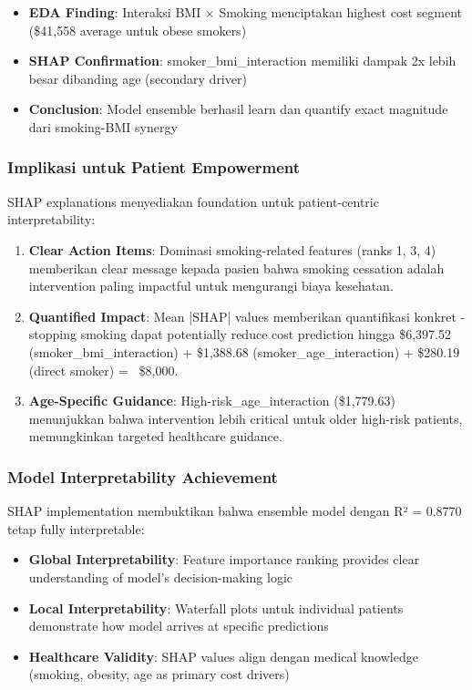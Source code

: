 \begin{itemize}
    \item \textbf{EDA Finding}: Interaksi BMI × Smoking menciptakan highest cost segment (\$41,558 average untuk obese smokers)
    \item \textbf{SHAP Confirmation}: smoker\_bmi\_interaction memiliki dampak 2x lebih besar dibanding age (secondary driver)
    \item \textbf{Conclusion}: Model ensemble berhasil learn dan quantify exact magnitude dari smoking-BMI synergy
\end{itemize}

\subsubsection{Implikasi untuk Patient Empowerment}

SHAP explanations menyediakan foundation untuk patient-centric interpretability:

\begin{enumerate}
    \item \textbf{Clear Action Items}: Dominasi smoking-related features (ranks 1, 3, 4) memberikan clear message kepada pasien bahwa smoking cessation adalah intervention paling impactful untuk mengurangi biaya kesehatan.

    \item \textbf{Quantified Impact}: Mean |SHAP| values memberikan quantifikasi konkret - stopping smoking dapat potentially reduce cost prediction hingga \$6,397.52 (smoker\_bmi\_interaction) + \$1,388.68 (smoker\_age\_interaction) + \$280.19 (direct smoker) = ~\$8,000.

    \item \textbf{Age-Specific Guidance}: High-risk\_age\_interaction (\$1,779.63) menunjukkan bahwa intervention lebih critical untuk older high-risk patients, memungkinkan targeted healthcare guidance.
\end{enumerate}

\subsubsection{Model Interpretability Achievement}

SHAP implementation membuktikan bahwa ensemble model dengan R² = 0.8770 tetap fully interpretable:

\begin{itemize}
    \item \textbf{Global Interpretability}: Feature importance ranking provides clear understanding of model's decision-making logic
    \item \textbf{Local Interpretability}: Waterfall plots untuk individual patients demonstrate how model arrives at specific predictions
    \item \textbf{Healthcare Validity}: SHAP values align dengan medical knowledge (smoking, obesity, age as primary cost drivers)
\end{itemize}

